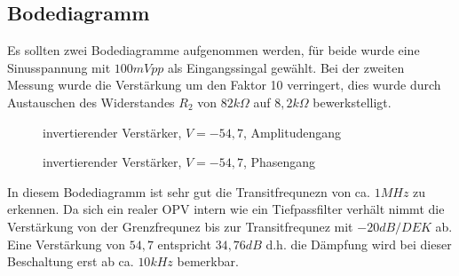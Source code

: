 \subsection{Bodediagramm}
Es sollten zwei Bodediagramme aufgenommen werden, f\"ur beide wurde eine Sinusspannung mit $100mVpp$ als Eingangssingal gew\"ahlt. Bei der zweiten Messung wurde die Verst\"arkung um den Faktor 10 verringert, dies wurde durch Austauschen des Widerstandes $R_2$ von $82k\Omega$ auf $8,2k\Omega$ bewerkstelligt.

\begin{figure}[H]
  \centering
  \caption{invertierender Verst\"arker, $V=-54,7$, Amplitudengang}
\end{figure}
\begin{figure}[H]
  \centering
  \caption{invertierender Verst\"arker, $V=-54,7$, Phasengang}
\end{figure}
\noindent
In diesem Bodediagramm ist sehr gut die Transitfrequnezn von ca. $1MHz$ zu erkennen. Da sich ein realer OPV intern wie ein Tiefpassfilter verh\"alt nimmt die Verst\"arkung von der Grenzfrequnez bis zur Transitfrequnez mit $-20dB/DEK$ ab. Eine Verst\"arkung von $54,7$ entspricht $34,76dB$ d.h. die D\"ampfung wird bei dieser Beschaltung erst ab ca. $10kHz$ bemerkbar.

